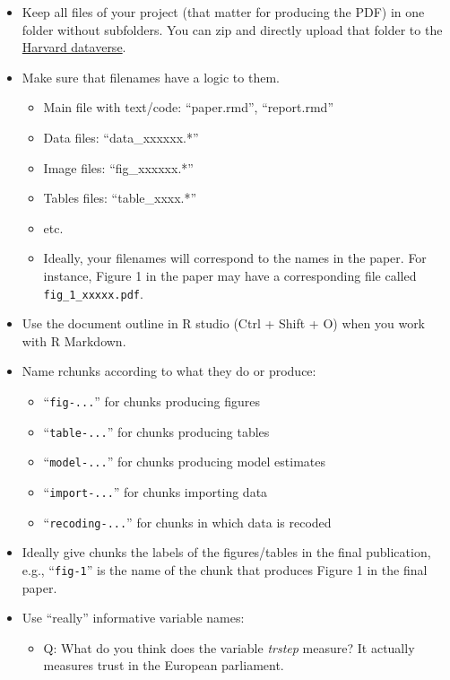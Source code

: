 \documentclass[
  12pt,
]{article}
\providecommand{\tightlist}{%
  \setlength{\itemsep}{0pt}\setlength{\parskip}{0pt}}
\begin{document}
\begin{itemize}
\tightlist
\item
  Keep all files of your project (that matter for producing the PDF) in one folder without subfolders. You can zip and directly upload that folder to the \href{https://dataverse.harvard.edu/}{Harvard dataverse}.
\item
  Make sure that filenames have a logic to them.

  \begin{itemize}
  \tightlist
  \item
    Main file with text/code: ``paper.rmd'', ``report.rmd''
  \item
    Data files: ``data\_xxxxxx.*''
  \item
    Image files: ``fig\_xxxxxx.*''
  \item
    Tables files: ``table\_xxxx.*''
  \item
    etc.
  \item
    Ideally, your filenames will correspond to the names in the paper. For instance, Figure 1 in the paper may have a corresponding file called \texttt{fig\_1\_xxxxx.pdf}.
  \end{itemize}
\item
  Use the document outline in R studio (Ctrl + Shift + O) when you work with R Markdown.
\item
  Name rchunks according to what they do or produce:

  \begin{itemize}
  \tightlist
  \item
    ``\texttt{fig-...}'' for chunks producing figures
  \item
    ``\texttt{table-...}'' for chunks producing tables
  \item
    ``\texttt{model-...}'' for chunks producing model estimates
  \item
    ``\texttt{import-...}'' for chunks importing data
  \item
    ``\texttt{recoding-...}'' for chunks in which data is recoded
  \end{itemize}
\item
  Ideally give chunks the labels of the figures/tables in the final publication, e.g., ``\texttt{fig-1}'' is the name of the chunk that produces Figure 1 in the final paper.
\item
  Use ``really'' informative variable names:

  \begin{itemize}
  \tightlist
  \item
    Q: What do you think does the variable \emph{trstep} measure? It actually measures trust in the European parliament.


\end{itemize}
\end{itemize}
\end{document}
